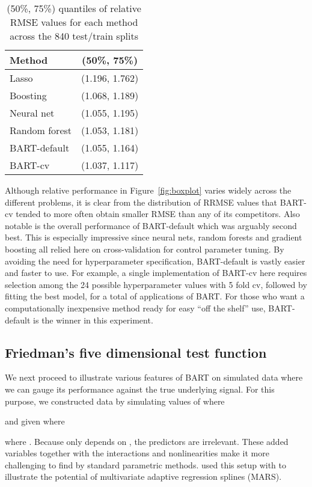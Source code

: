 \documentclass[aoas,nameyear,dvips]{arximspdf}
\newcommand{\citeasnoun}[1]{\citet{#1}}
\begin{document}
\begin{table}
\tablewidth=170pt
\caption{(50\%, 75\%) quantiles of relative RMSE values for each method across the 840 test/train splits}\label{tab:perf}
\begin{tabular*}{170pt}{@{\extracolsep{\fill}}lc@{}}
\hline
\textbf{Method}         &   \textbf{(50\%, 75\%)}     \\
\hline
Lasso         & (1.196, 1.762)\\
Boosting      & (1.068, 1.189)\\
Neural net    & (1.055, 1.195)\\
Random forest & (1.053, 1.181)\\
BART-default  & (1.055, 1.164)\\
BART-cv       & (1.037, 1.117)\\
\hline
\end{tabular*}
\end{table}

Although relative performance in Figure~\ref{fig:boxplot} varies widely across the different problems, it is clear from the distribution of RRMSE values  that BART-cv tended to more often obtain smaller RMSE than any of its competitors.   Also notable is the overall performance of BART-default which was arguably second best.  This is especially impressive since neural nets, random forests and gradient boosting all relied here on cross-validation for control parameter tuning.   By avoiding the need for hyperparameter specification, BART-default is vastly easier and faster to use. For example, a single implementation of BART-cv here requires
selection among the 24 possible hyperparameter values with 5 fold cv,
followed by fitting the best model, for a total of 
applications of BART.  For those who want a computationally inexpensive method ready for
easy ``off the shelf'' use, BART-default is the winner in this experiment.


\subsection{Friedman's five dimensional test function}\label{sec:simex:friedman}


We next proceed to illustrate various features of BART on simulated data where
we can gauge its performance against the true underlying signal. For this purpose,
we  constructed  data by
simulating values of  where

and  given  where

where .  Because  only depends on
, the predictors  are irrelevant.
These added variables together with the interactions and
nonlinearities make it more challenging to find  by
standard parametric methods.  \citeasnoun{Frie1991} used this setup
with  to illustrate the potential of
multivariate adaptive regression
splines (MARS).
\end{document}
